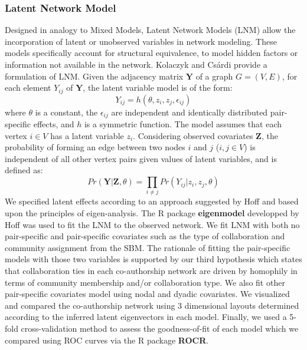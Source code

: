 \subsubsection{Latent Network Model}
\label{sec:methods_lnm}
Designed in analogy to Mixed Models, Latent Network Models (LNM) allow the incorporation of latent or unobserved variables in network modeling. These models specifically account for structural equivalence, to model hidden factors or information not available in the network. Kolaczyk and Cs\'ardi \cite{kolaczyk_statistical_2014} provide a formulation of LNM. Given the adjacency matrix $\mathbf{Y}$ of a graph $G=(V,E)$, for each element $Y_{ij}$ of $\mathbf{Y}$, the latent variable model is of the form:
\begin{equation}Y_{ij}=h(\theta,z_i,z_j,\epsilon_{ij})\end{equation} where $\theta$ is a constant, the $\epsilon_{ij}$ are independent and identically distributed pair-specific effects, and $h$ is a symmetric function. The model assumes that each vertex $i\in V$ has a latent variable $z_i$. Considering observed covariates $\mathbf{Z}$, the probability of forming an edge between two nodes $i$ and $j$ ($i,j \in V$) is independent of all other vertex pairs given values of latent variables, and is defined as:
\begin{equation}
Pr(\mathbf{Y}|\mathbf{Z},\theta)=\prod_{i\neq j}Pr\left(Y_{ij}|z_i,z_j,\theta \right)
\end{equation}
We specified latent effects according to an approach suggested by Hoff \cite{hoff_modeling_2008} and based upon the principles of eigen-analysis. The R package \textbf{eigenmodel} developped by Hoff \cite{hoff_eigenmodel:_2012} was used to fit the LNM to the observed network. We fit LNM with both no pair-specific and pair-specific covariates such as the type of collaboration and community assignment from the SBM. The rationale of fitting the pair-specific models with those two variables is supported by our third hypothesis which states that collaboration ties in each co-authorship network are driven by homophily in terms of community membership and/or collaboration type. We also fit other pair-specific covariates model using nodal and dyadic covariates. We visualized and compared the co-authorship network using 3 dimensional layouts determined according to the inferred latent eigenvectors in each model. Finally, we used a 5-fold cross-validation method to assess the goodness-of-fit of each model which we compared using ROC curves via the R package \textbf{ROCR}.


